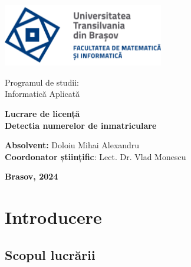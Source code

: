 \documentclass[12pt]{article}
\begin{document}
\begin{titlepage}

    \begin{minipage}{0.6\textwidth}
        \includegraphics[width=7cm]{logo_ro-RO.png}
    \end{minipage}
    \begin{minipage}{0.3\textwidth}
        \center
        {Programul de studii: \\ Informatic\u{a} Aplicat\u{a}}
    \end{minipage}
    
    \vspace*{5 cm} 

    \begin{center}
            {\Large \textbf{Lucrare de licență \\ Detectia numerelor de inmatriculare}}\\[2 cm]        
    \end{center}

    \vspace*{2 cm} 
    
    {\raggedright \normalsize \textbf{Absolvent:} Doloiu Mihai Alexandru \\ \textbf{Coordonator științific}: Lect. Dr. Vlad Monescu}
    
    \vspace*{\fill} 
    \begin{center}
        {\Large \centering \textbf{Brasov, 2024}}
    \end{center}
\end{titlepage}

\tableofcontents

\listoffigures

\newpage

\section{Introducere}

\subsection{Scopul lucrării}
\end{document}
